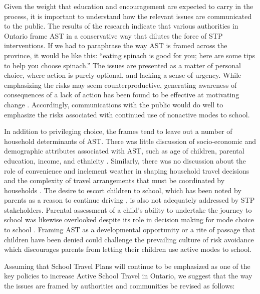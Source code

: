 \documentclass[preprint, 3p,
authoryear]{elsarticle} %
\begin{document}
Given the weight that education and encouragement are expected to carry
in the process, it is important to understand how the relevant issues
are communicated to the public. The results of the research indicate
that various authorities in Ontario frame AST in a conservative way that
dilutes the force of STP interventions. If we had to paraphrase the way
AST is framed across the province, it would be like this: ``eating
spinach is good for you; here are some tips to help you choose
spinach.'' The issues are presented as a matter of personal choice,
where action is purely optional, and lacking a sense of urgency. While
emphasizing the risks may seem counterproductive, generating awareness
of consequences of a lack of action has been found to be effective at
motivating change
\citep[e.g.,][]{lawlor2018risk, waygoodCO2ValenceFraming2018}.
Accordingly, communications with the public would do well to emphasize
the risks associated with continued use of nonactive modes to school.

In addition to privileging choice, the frames tend to leave out a number
of household determinants of AST. There was little discussion of
socio-economic and demographic attributes associated with AST, such as
age of children, parental education, income, and ethnicity
\citep{rothmanDeclineActiveSchool2018}. Similarly, there was no
discussion about the role of convenience and inclement weather in
shaping household travel decisions
\citep{buliungSchoolTravelPlanning2011} and the complexity of travel
arrangements that must be coordinated by households
\citep[see][]{buliungLivingJourneySchool2021}. The desire to escort
children to school, which has been noted by parents as a reason to
continue driving \citep{westmanWhatDrivesThem2017}, is also not
adequately addressed by STP stakeholders. Parental assessment of a
child's ability to undertake the journey to school was likewise
overlooked despite its role in decision making for mode choice to school
\citep{faulknerWhatQuickestEasiest2010}. Framing AST as a developmental
opportunity or a rite of passage that children have been denied could
challenge the prevailing culture of risk avoidance which discourages
parents from letting their children use active modes to school.

Assuming that School Travel Plans will continue to be emphasized as one
of the key policies to increase Active School Travel in Ontario, we
suggest that the way the issues are framed by authorities and
communities be revised as follows:
\end{document}
